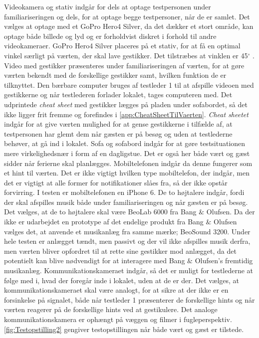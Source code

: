 Videokamera og stativ indgår for dels at optage testpersonen under familiariseringen og dels, for at optage begge testpersoner, når de er samlet. Det vælges at optage med et GoPro Hero4 Silver, da det dækker et stort område, kan optage både billede og lyd og er forholdvist diskret i forhold til andre videokameraer. GoPro Hero4 Silver placeres på et stativ, for at få en optimal vinkel særligt på værten, der skal lave gestikker. Det tilstræbes at vinklen er 45$^{\circ}$ . Video med gestikker præsenteres under familiariseringen af værten, for at gøre værten bekendt med de forskellige gestikker samt, hvilken funktion de er tilknyttet. Den bærbare computer bruges af testleder 1 til at afspille videoen med gestikkerne og når testlederen forlader lokalet, tages computeren med. Det udprintede \textit{cheat sheet} med gestikker lægges på pladen under sofabordet, så det ikke ligger frit fremme og forefindes i \autoref{app:CheatSheetTilVaerten}. \textit{Cheat sheetet} indgår for at give værten mulighed for at gense gestikkerne i tilfælde af, at testpersonen har glemt dem når gæsten er på besøg og uden at testlederne behøver, at gå ind i lokalet. Sofa og sofabord indgår for at gøre testsituationen mere virkelighedsnær i form af en dagligstue. Det er også her både vært og gæst sidder når ferierne skal planlægges. Mobiltelefonen indgår da denne fungerer som et hint til værten. Det er ikke vigtigt hvilken type mobiltelefon, der indgår, men det er vigtigt at alle former for notifikationer slåes fra, så der ikke opstår forvirring. I testen er mobiltelefonen en iPhone 6. De to højtalere indgår, fordi der skal afspilles musik både under familiariseringen og når gæsten er på besøg. Det vælges, at de to højtalere skal være BeoLab 6000 fra Bang $\&$ Olufsen. Da der ikke er udarbejdet en prototype af det endelige produkt fra Bang $\&$ Olufsen vælges det, at anvende et musikanlæg fra samme mærke; BeoSound 3200. Under hele testen er anlægget tændt, men passivt og der vil ikke afspilles musik derfra, men værten bliver opfordret til at rette sine gestikker mod anlægget, da det potentielt kan blive nødvendigt for at interagere med Bang $\&$ Olufsen's fremtidig musikanlæg. Kommunikationskameraet indgår, så det er muligt for testlederne at følge med i, hvad der foregår inde i lokalet, uden at de er der. Det vælges, at kommunikationskameraet skal være analogt, for at sikre at der ikke er en forsinkelse på signalet, både når testleder 1 præsenterer de forskellige hints og når værten reagerer på de forskellige hints ved at gestikulere. Det analoge kommunikationskamera er ophængt på væggen og filmer i fugleperspektiv. \autoref{fig:Testopstilling2} gengiver testopstillingen når både vært og gæst er tilstede. 
